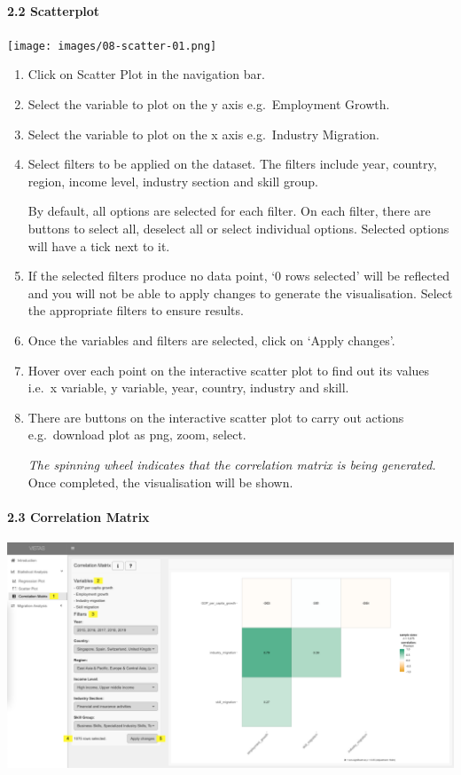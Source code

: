 \documentclass[
]{article}
\begin{document}
\hypertarget{scatterplot}{%
\paragraph{2.2 Scatterplot}\label{scatterplot}}

\texttt{[image: images/08-scatter-01.png]}

\begin{enumerate}
\def\labelenumi{\arabic{enumi}.}
\item
  Click on Scatter Plot in the navigation bar.
\item
  Select the variable to plot on the y axis e.g.~Employment Growth.
\item
  Select the variable to plot on the x axis e.g.~Industry Migration.
\item
  Select filters to be applied on the dataset. The filters include year,
  country, region, income level, industry section and skill group.

  By default, all options are selected for each filter. On each filter,
  there are buttons to select all, deselect all or select individual
  options. Selected options will have a tick next to it.
\item
  If the selected filters produce no data point, `0 rows selected' will
  be reflected and you will not be able to apply changes to generate the
  visualisation. Select the appropriate filters to ensure results.
\item
  Once the variables and filters are selected, click on `Apply changes'.
\item
  Hover over each point on the interactive scatter plot to find out its
  values i.e.~x variable, y variable, year, country, industry and skill.
\item
  There are buttons on the interactive scatter plot to carry out actions
  e.g.~download plot as png, zoom, select.

  \emph{The spinning wheel indicates that the correlation matrix is
  being generated.} Once completed, the visualisation will be shown.
\end{enumerate}

\hypertarget{correlation-matrix}{%
\paragraph{2.3 Correlation Matrix}\label{correlation-matrix}}

\includegraphics{images/09-correlation.png}
\end{document}
